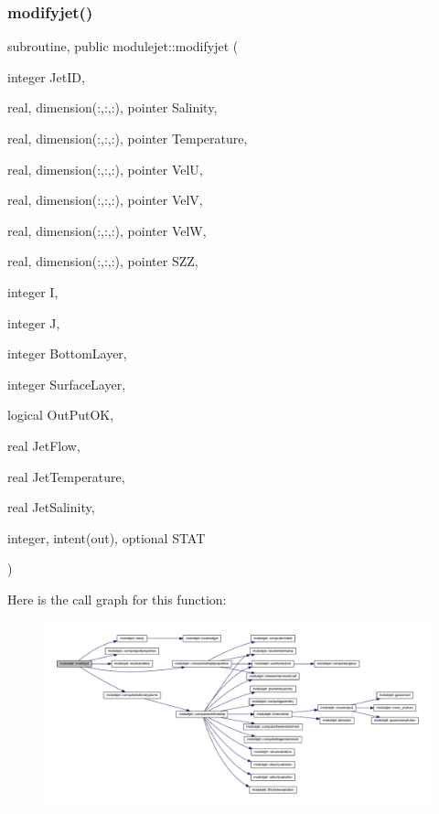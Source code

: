 \subsubsection{\texorpdfstring{modifyjet()}{modifyjet()}}
{\footnotesize\ttfamily subroutine, public modulejet\+::modifyjet (\begin{DoxyParamCaption}\item[{integer}]{Jet\+ID,  }\item[{real, dimension(\+:,\+:,\+:), pointer}]{Salinity,  }\item[{real, dimension(\+:,\+:,\+:), pointer}]{Temperature,  }\item[{real, dimension(\+:,\+:,\+:), pointer}]{VelU,  }\item[{real, dimension(\+:,\+:,\+:), pointer}]{VelV,  }\item[{real, dimension(\+:,\+:,\+:), pointer}]{VelW,  }\item[{real, dimension(\+:,\+:,\+:), pointer}]{S\+ZZ,  }\item[{integer}]{I,  }\item[{integer}]{J,  }\item[{integer}]{Bottom\+Layer,  }\item[{integer}]{Surface\+Layer,  }\item[{logical}]{Out\+Put\+OK,  }\item[{real}]{Jet\+Flow,  }\item[{real}]{Jet\+Temperature,  }\item[{real}]{Jet\+Salinity,  }\item[{integer, intent(out), optional}]{S\+T\+AT }\end{DoxyParamCaption})}

Here is the call graph for this function\+:\nopagebreak
\begin{figure}[H]
\begin{center}
\leavevmode
\includegraphics[width=350pt]{namespacemodulejet_aabae5c457f7fe1dd3d3f540d56e94877_cgraph}
\end{center}
\end{figure}
\mbox{\label{namespacemodulejet_a9175197cbe465e40fa03bc6a7c788871}} 
